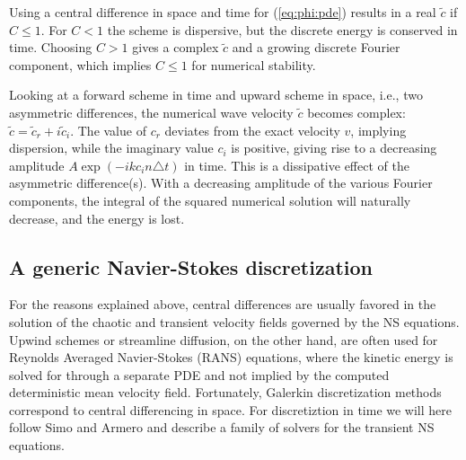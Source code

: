 Using a central difference in space and time for (\ref{eq:phi:pde})
results in a real $\tilde c$ if $C\leq 1$.
For $C<1$ the scheme is dispersive, but
the discrete energy  is conserved in time.
Choosing $C>1$ gives a complex $\tilde c$ and a growing discrete Fourier
component, which implies $C\leq1$ for numerical stability.

Looking at a forward scheme in time and upward scheme in space, i.e.,
two asymmetric differences, the numerical wave velocity $\tilde c$ becomes
complex: $\tilde c = \tilde c_r + i\tilde c_i$. 
The value of $c_r$ deviates from the exact velocity $v$, implying
dispersion, while the imaginary value $c_i$ is positive, giving rise
to a decreasing amplitude $A\exp{(-ikc_i n\triangle t)}$ in time.
This is a dissipative effect of the asymmetric difference(s). 
With a decreasing amplitude of the various
Fourier components, the integral of the squared numerical solution will
naturally decrease, and the energy is lost.


\subsection{A generic Navier-Stokes discretization}
\label{sec:NS-solver}

For the reasons explained above, central differences are
usually favored in the solution of the chaotic and transient velocity
fields governed by the NS equations. Upwind schemes or streamline
diffusion, on the other hand, are often used for Reynolds Averaged
Navier-Stokes (RANS) equations, where the kinetic energy is solved for
through a separate PDE and not implied by the computed deterministic
mean velocity field. Fortunately, Galerkin discretization methods correspond to central differencing in space.  
For discretiztion in time we will here follow Simo and Armero \cite{simo94} and describe a family of solvers for the transient NS equations.

